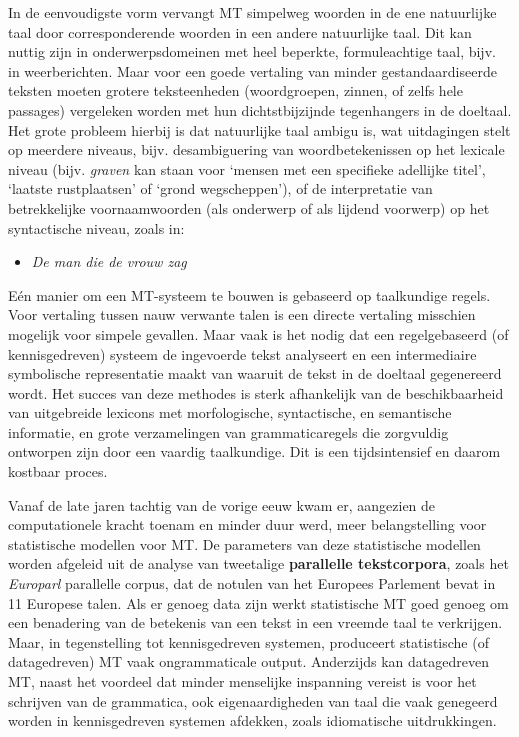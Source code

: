 \documentclass[]{../../metanetpaper}
\begin{document}
\begin{multicols}{2}

    In de eenvoudigste vorm vervangt MT simpelweg woorden in de ene natuurlijke taal door corresponderende woorden in een andere natuurlijke taal. Dit kan nuttig zijn in onderwerpsdomeinen met heel beperkte, formuleachtige taal, bijv. in weerberichten. Maar voor een goede vertaling van minder gestandaardiseerde teksten moeten grotere teksteenheden (woordgroepen, zinnen, of zelfs hele passages) vergeleken worden met hun dichtstbijzijnde tegenhangers in de doeltaal. Het grote probleem hierbij is dat natuurlijke taal ambigu is, wat uitdagingen stelt op meerdere niveaus, bijv. desambiguering van woordbetekenissen op het lexicale niveau (bijv. \emph{graven} kan staan voor `mensen met een specifieke adellijke titel', `laatste rustplaatsen' of `grond wegscheppen'), of de interpretatie van betrekkelijke voornaamwoorden (als onderwerp of als lijdend voorwerp) op het syntactische niveau, zoals in:\\

   \begin{itemize}
     \item    \emph{De man die de vrouw zag}
   \end{itemize}
 

    E{\'e}n manier om een MT-systeem te bouwen is gebaseerd op taalkundige regels. Voor vertaling tussen nauw verwante talen is een directe vertaling misschien mogelijk voor simpele gevallen. Maar vaak is het nodig dat een regelgebaseerd (of kennisgedreven) systeem de ingevoerde tekst analyseert en een intermediaire symbolische representatie maakt van waaruit de tekst in de doeltaal gegenereerd wordt. Het succes van deze methodes is sterk afhankelijk van de beschikbaarheid van uitgebreide lexicons met morfologische, syntactische, en semantische informatie, en grote verzamelingen van grammaticaregels die zorgvuldig ontworpen zijn door een vaardig taalkundige. Dit is een tijdsintensief en daarom kostbaar proces.


    Vanaf de late jaren tachtig van de vorige eeuw kwam er, aangezien de computationele kracht toenam en minder duur werd, meer belangstelling voor statistische modellen voor MT. De parameters van deze statistische modellen worden afgeleid uit de analyse van tweetalige \textbf{parallelle tekstcorpora}, zoals het \emph{Europarl} parallelle corpus, dat de notulen van het Europees Parlement bevat in 11 Europese talen. Als er genoeg data zijn werkt statistische MT goed genoeg om een benadering van de betekenis van een tekst in een vreemde taal te verkrijgen. Maar, in tegenstelling tot kennisgedreven systemen, produceert statistische (of datagedreven) MT vaak ongrammaticale output. Anderzijds kan datagedreven MT, naast het voordeel dat minder menselijke inspanning vereist is voor het schrijven van de grammatica, ook eigenaardigheden van  taal die vaak genegeerd worden in kennisgedreven systemen afdekken, zoals idiomatische uitdrukkingen.


\end{multicols}
\end{document}
